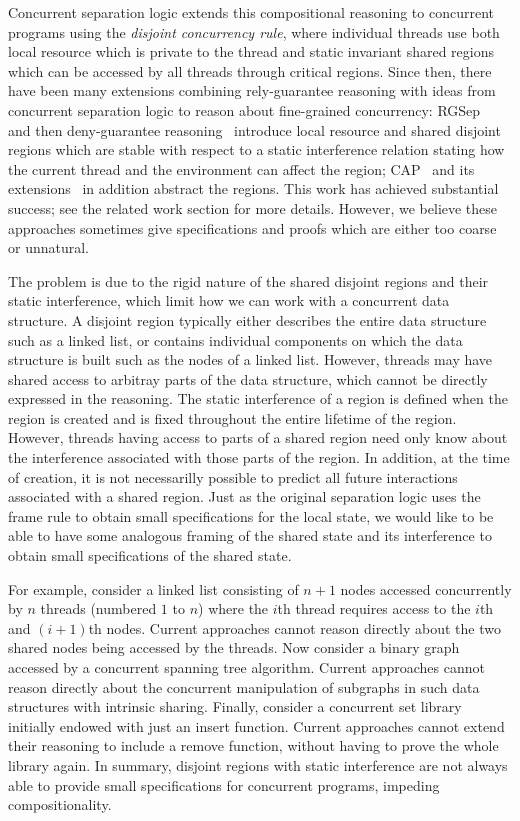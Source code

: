 Concurrent separation logic extends this compositional reasoning to
concurrent programs using the {\em disjoint concurrency rule}, where
individual threads use both local resource which is private to the
thread and static invariant shared regions which can be accessed by
all threads through critical regions. Since then, there have been many
extensions combining rely-guarantee reasoning with ideas from
concurrent separation logic to reason about fine-grained concurrency:
RGSep~\cite{viktor-marriage} and then deny-guarantee
reasoning~\cite{dg} introduce local resource and shared disjoint
regions which are stable with respect to a static interference
relation stating how the current thread and the environment can affect
the region; CAP~\cite{cap-ecoop10} and its
extensions~\cite{hocap,icap,tada} in addition abstract the
regions. This work has achieved substantial success; see the related
work section for more details. However, we believe these approaches
sometimes give specifications and proofs which are either too coarse
or unnatural.



The problem is due to the rigid nature of the shared disjoint regions and
their static interference, which   limit how we can  work
with a
concurrent data structure. A disjoint region typically either describes 
the entire data structure such as a linked list,  or contains
individual 
components on which the data structure is built such as the nodes of a
linked list. However, threads may have shared access to arbitray 
parts of the data structure, which cannot be directly expressed in the reasoning.
The   static interference   of a region 
 is defined when
the region  is created and    is fixed throughout the entire lifetime of
the region. However, 
threads having access to parts of a shared region need  only
 know about the interference associated with those parts of the
region. In addition, 
at the time  of creation, it is not necessarilly possible
to predict all future interactions  associated with  a shared
region. Just as the original separation logic  uses the frame rule to
obtain small specifications for the local state, we would like to be
able to have some analogous framing of the shared state and its
interference  to obtain small
specifications of the shared state. 


For example, consider a linked list consisting of $n+1$ nodes accessed
concurrently by $n$ threads (numbered $1$ to $n$) where the $i$th
thread requires access to the $i$th and $(i+1)$th nodes. Current
approaches cannot reason directly about the two shared nodes being
accessed by the threads. Now consider a binary graph accessed by a
concurrent spanning tree algorithm. Current approaches cannot reason
directly about the concurrent manipulation of subgraphs in such data
structures with intrinsic sharing. Finally, consider a concurrent set
library initially endowed with just an insert function. Current
approaches cannot extend their reasoning to include a remove function,
without having to prove the whole library again. In summary, disjoint
regions with static interference are not always able to provide small
specifications for concurrent programs, impeding 
compositionality.

